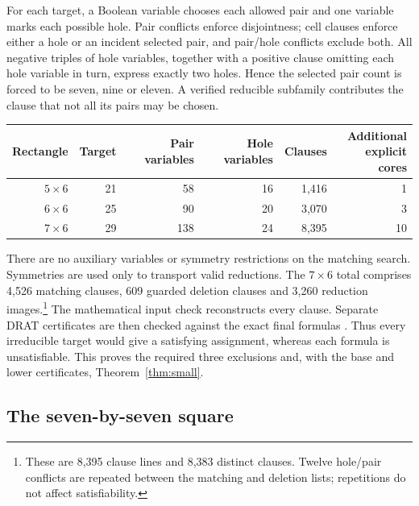 \documentclass[11pt,a4paper]{article}
\theoremstyle{definition}
\begin{document}
For each target, a Boolean variable chooses each allowed pair and one
variable marks each possible hole. Pair conflicts enforce disjointness;
cell clauses enforce either a hole or an incident selected pair, and
pair/hole conflicts exclude both. All negative triples of hole variables,
together with a positive clause omitting each hole variable in turn,
express exactly two holes. Hence the selected pair count is forced to
be seven, nine or eleven. A verified reducible subfamily contributes
the clause that not all its pairs may be chosen.

\begin{center}
\begin{tabular}{rrrrrr}
\toprule
Rectangle&Target&Pair variables&Hole variables&Clauses&\shortstack{Additional\\explicit cores}\\
\midrule
$5\times6$&21&58&16&1,416&1\\
$6\times6$&25&90&20&3,070&3\\
$7\times6$&29&138&24&8,395&10\\
\bottomrule
\end{tabular}
\end{center}
There are no auxiliary variables or symmetry restrictions on the
matching search. Symmetries are used only to transport valid reductions.
The $7\times6$ total comprises 4,526 matching clauses, 609 guarded
deletion clauses and 3,260 reduction images.\footnote{These are 8,395
clause lines and 8,383 distinct clauses. Twelve hole/pair conflicts are
repeated between the matching and deletion lists; repetitions do not
affect satisfiability.} The mathematical input
check reconstructs every clause. Separate DRAT certificates are then
checked against the exact final formulas \cite{DRAT}. Thus every
irreducible target would give a satisfying assignment, whereas each
formula is unsatisfiable. This proves the required three exclusions and,
with the base and lower certificates, Theorem~\ref{thm:small}.

\subsection{The seven-by-seven square}
\end{document}

